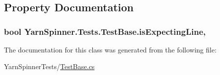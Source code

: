 \subsection{Property Documentation}
\hypertarget{a00144_a47f35b8e8123ed9471883d02b8bc9f3e}{
\subsubsection[{is\-Expecting\-Line}]{\setlength{\rightskip}{0pt plus 5cm}bool Yarn\-Spinner.\-Tests.\-Test\-Base.\-is\-Expecting\-Line\hspace{0.3cm}{\ttfamily [get]}, {\ttfamily [protected]}}}\label{a00144_a47f35b8e8123ed9471883d02b8bc9f3e}


The documentation for this class was generated from the following file\-:\begin{DoxyCompactItemize}
\item 
Yarn\-Spinner\-Tests/\hyperlink{a00279}{Test\-Base.\-cs}\end{DoxyCompactItemize}
